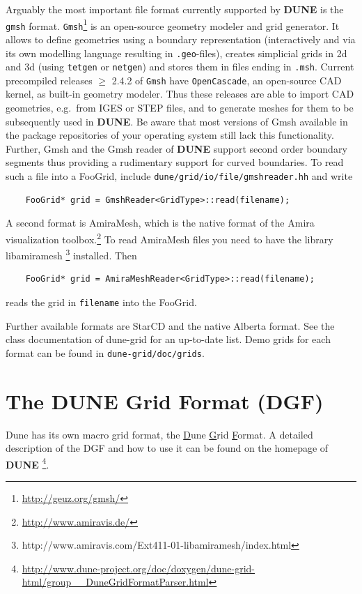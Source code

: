 \documentclass[11pt,a4paper,headinclude,footinclude,DIV16,normalheadings]{scrreprt}
\newcommand{\Dune}{{\sf\bfseries DUNE}\xspace}
\begin{document}
Arguably the most important file format currently supported by \Dune is
the \lstinline!gmsh! format.  \lstinline!Gmsh!\footnote{\url{http://geuz.org/gmsh/}}
is an open-source geometry modeler and grid generator.  It allows to define
geometries using a boundary representation (interactively and via its
own modelling language resulting in \lstinline!.geo!-files), 
creates simplicial grids in 2d and 3d (using
\lstinline!tetgen! or \lstinline!netgen!)
and stores them in files ending in \lstinline!.msh!. Current precompiled
releases $\geq$ 2.4.2 of \lstinline!Gmsh! have \lstinline!OpenCascade!, an open-source CAD
kernel, as built-in geometry modeler. Thus these releases are able to import 
CAD geometries, e.g.\ from IGES or STEP files, and to generate meshes for them to
be subsequently used in \Dune. Be aware that most versions of Gmsh available in
the package repositories of your operating system still lack this functionality.
Further, Gmsh and the Gmsh reader of \Dune support second order
boundary segments thus providing a rudimentary support for curved boundaries.
To read such a file into a FooGrid, include \lstinline!dune/grid/io/file/gmshreader.hh!
and write
\begin{lstlisting}
    FooGrid* grid = GmshReader<GridType>::read(filename);
\end{lstlisting}

A second format is AmiraMesh, which is the native format of the Amira
visualization toolbox.\footnote{\url{http://www.amiravis.de/}}
To read AmiraMesh files you need to have the library libamiramesh%
\footnote{http://www.amiravis.com/Ext411-01-libamiramesh/index.html}
installed.  Then
\begin{lstlisting}
    FooGrid* grid = AmiraMeshReader<GridType>::read(filename);
\end{lstlisting}
reads the grid in \lstinline!filename! into the FooGrid.

Further available formats are StarCD and the native Alberta format.
See the class documentation of dune-grid for an up-to-date list.
Demo grids for each format can be found in \lstinline!dune-grid/doc/grids!.



\section{The \texorpdfstring{\Dune}{Dune} Grid Format (DGF)}

Dune has its own macro grid format, the \underline{D}une \underline{G}rid \underline{F}ormat. 
A detailed description of the DGF and how to use it can be found on the
homepage of \Dune%
\footnote{\url{http://www.dune-project.org/doc/doxygen/dune-grid-html/group__DuneGridFormatParser.html}}.
\end{document}
